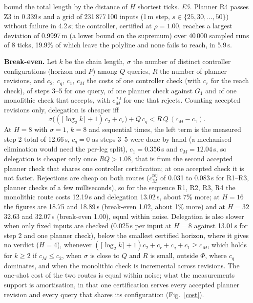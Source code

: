 \documentclass[10pt,a4paper]{article}
\makeatletter
\renewcommand\section{\@startsection{section}{1}{0pt}{0.8ex plus .2ex}{0.4ex}{\normalfont\large\bfseries}}
\makeatother
\begin{document}
bound the total length by the distance of $H$ shortest ticks. \emph{E5.} Planner R4 passes Z3 in 0.339\,s and a grid of 231\,877\,100 inputs (1\,m step, $s\in\{25,30,\dots,50\}$) without failure in 4.2\,s; the controller, certified at $\rho=1.00$, reaches a largest deviation of 0.9997\,m (a lower bound on the supremum) over 40\,000 sampled runs of 8 ticks, 19.9\% of which leave the polyline and none fails to reach, in 5.9\,s.

\textbf{Break-even.} Let $k$ be the chain length, $\sigma$ the number of distinct controller configurations (horizon and $P$) among $Q$ queries, $R$ the number of planner revisions, and $c_2$, $c_q$, $c_1$, $c_M$ the costs of one controller check (with $c_r$ for the reach check), of steps 3--5 for one query, of one planner check against $G_1$ and of one monolithic check that accepts, with $c_M^{\mathrm{rej}}$ for one that rejects. Counting accepted revisions only, delegation is cheaper iff
\[\sigma\bigl((\lceil\log_2k\rceil+1)\,c_2+c_r\bigr)+Q\,c_q<R\,Q\,(c_M-c_1).\]
At $H=8$ with $\sigma=1$, $k=8$ and sequential times, the left term is the measured step-2 total of 12.66\,s, $c_q=0$ as steps 3--5 were done by hand (a mechanised elimination would need the per-leg split), $c_1=0.356$\,s and $c_M=12.04$\,s, so delegation is cheaper only once $RQ>1.08$, that is from the second accepted planner check that shares one controller certification; at one accepted check it is not faster. Rejections are cheap on both routes ($c_M^{\mathrm{rej}}$ of 0.031 to 0.083\,s for R1--R3, planner checks of a few milliseconds), so for the sequence R1, R2, R3, R4 the monolithic route costs 12.19\,s and delegation 13.02\,s, about 7\% more; at $H=16$ the figures are 18.75 and 18.89\,s (break-even 1.02, about 1\% more) and at $H=32$ 32.63 and 32.07\,s (break-even 1.00), equal within noise. Delegation is also slower when only fixed inputs are checked (0.025\,s per input at $H=8$ against 13.01\,s for step 2 and one planner check), below the smallest certified horizon, where it gives no verdict ($H=4$), whenever $(\lceil\log_2k\rceil+1)c_2+c_r+c_q+c_1\ge c_M$, which holds for $k\ge2$ if $c_M\le c_2$, when $\sigma$ is close to $Q$ and $R$ is small, outside $\Phi$, where $c_q$ dominates, and when the monolithic check is incremental across revisions. The one-shot cost of the two routes is equal within noise; what the measurements support is amortisation, in that one certification serves every accepted planner revision and every query that shares its configuration (Fig.~\ref{cost}).

\section{Limits}
\end{document}
